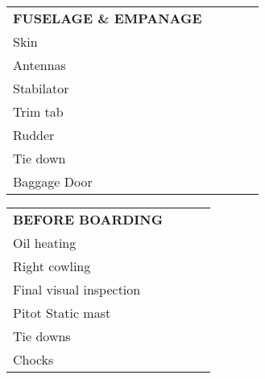 \documentclass[10pt]{article}
\newenvironment{checklist}[1]{%
  \renewcommand{\item}[2]{%
    ##1\hspace{2em}\dotfill\makebox{\uppercase{##2}}\\
  }
  \newcommand{\step}[1]{%
    \hspace*{10em}-\hspace*{\labelsep}##1\\
  }
  \begin{tabular}{p{0.8\linewidth}}
       \multicolumn{1}{l}{\textbf{\uppercase{#1}}}\\
}{\end{tabular}\vspace{1em}}
\begin{document}
\begin{multicols}{2}
\begin{checklist}{Fuselage \& Empanage}
  \item{Skin}{check}
  \item{Antennas}{check}
  \item{Stabilator}{check}
  \item{Trim tab}{check}
  \item{Rudder}{check}
  \item{Tie down}{remove}
  \item{Baggage Door}{check}
\end{checklist}

\begin{checklist}{Before boarding}
  \item{Oil heating}{remove}
  \item{Right cowling}{close}
  \item{Final visual inspection}{}
  \item{Pitot Static mast}{check}
  \item{Tie downs}{check}
  \item{Chocks}{check}
\end{checklist}
\end{multicols}
\end{document}
